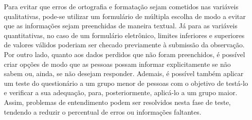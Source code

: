 \documentclass[10pt,a4paper,oneside]{article}
\begin{document}
Para evitar que erros de ortografia e formatação sejam cometidos nas variáveis qualitativas, pode-se utilizar um formulário de múltipla escolha de modo a evitar que as informações sejam preenchidas de maneira textual. Já para as variáveis quantitativas, no caso de um formulário eletrônico, limites inferiores e superiores de valores válidos poderiam ser checado previamente à submissão da observação. Por outro lado, quanto aos dados perdidos que não foram preenchidos, é possível criar opções de modo que as pessoas possam informar explicitamente se não sabem ou, ainda, se não desejam responder. Ademais, é possível também aplicar um teste do questionário a um grupo menor de pessoas com o objetivo de testá-lo e verificar a sua adequação, para, posteriormente, aplicá-lo a um grupo maior. Assim, problemas de entendimento podem ser resolvidos nesta fase de teste, tendendo a reduzir o percentual de erros ou informações faltantes.
\end{document}

